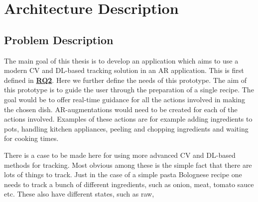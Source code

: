 \chapter{Architecture Description} \label{Arch description}

\section{Problem Description} \label{probDesc}

The main goal of this thesis is to develop an application which aims to use a 
modern CV and DL-based tracking solution in an AR application. This is first 
defined in \hyperref[rq2]{\textbf{RQ2}}. Here we further define the needs of 
this prototype. 
The aim of this prototype is to guide the user through the preparation of a 
single recipe. 
The goal would be to offer real-time guidance for all the actions involved in 
making the chosen dish. AR-augmentations would need to be created for each of 
the actions involved. Examples of these actions are for example adding 
ingredients to pots, handling kitchen appliances, peeling and chopping 
ingredients and waiting for cooking times. \par
	There is a case to be made here for using more advanced CV and 
DL-based methods for tracking. Most obvious among these is the simple fact 
that there are lots of things to track. Just in the case of a simple pasta 
Bolognese recipe one needs to track a bunch of different ingredients, such as 
onion, meat, tomato sauce etc. These also have different states, such as raw, 
